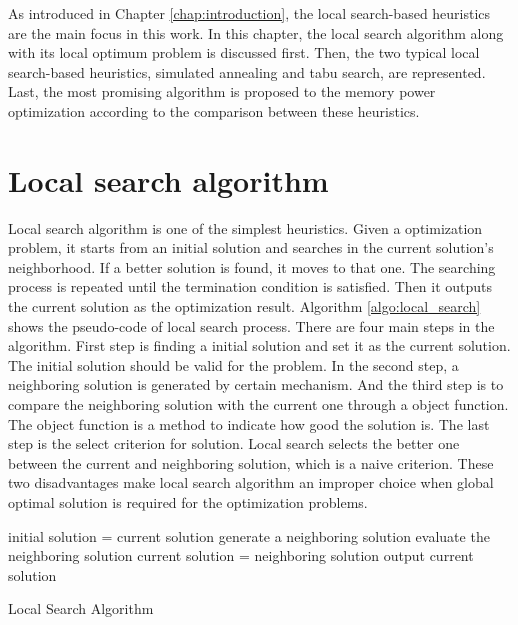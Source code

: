 \label{chap:algorithm_selection}
As introduced in Chapter \ref{chap:introduction}, the local search-based heuristics are the main focus in this work.
In this chapter, the local search algorithm along with its local optimum problem is discussed first. Then, the two typical
local search-based heuristics, simulated annealing and tabu search, are represented. Last, the most promising algorithm is
proposed to the memory power optimization according to the comparison between these heuristics.

	\section{Local search algorithm}
	\label{sec:local_search}
	Local search algorithm is one of the simplest heuristics. Given a optimization problem, it starts from an initial solution
	and searches in the current solution's neighborhood. If a better solution is found, it moves to that one. The searching process
	is repeated until the termination condition is satisfied. Then it outputs the current solution as the optimization result.
	Algorithm \ref{algo:local_search} shows the pseudo-code of local search process. There are four main steps in the algorithm.
	First step is finding a initial solution and set it as the current solution. The initial solution should be valid for the problem.
	In the second step, a neighboring solution is generated by certain mechanism. And the third step is to compare the neighboring
	solution with the current one through a object function. The object function is a method to indicate how good the solution is.
	The last step is the select criterion for solution. Local search selects the better one between the current and neighboring
	solution, which is a naive criterion. These two disadvantages make local search algorithm an improper choice when global optimal
	solution is required for the optimization problems.
	
	\begin{algorithm2e}[H]
	initial solution = current solution\;
	{
		generate a neighboring solution\;
		evaluate the neighboring solution\;
		{
			current solution = neighboring solution\;
		}
	}
	output current solution\;
	\caption{Local Search Algorithm}
	\label{algo:local_search}
	\end{algorithm2e}
	
